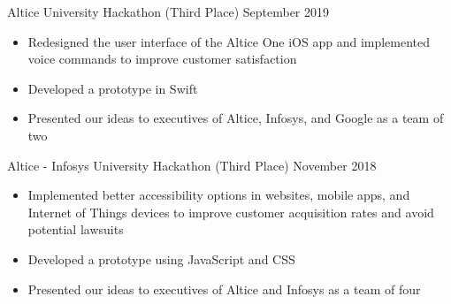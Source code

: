 \documentclass{article}
\begin{document}
\noindent
Altice University Hackathon (Third Place)
\hfill
September 2019\\
\vspace{-1em}
\begin{itemize}
\item Redesigned the user interface of the Altice One iOS app and implemented voice commands to improve customer satisfaction
\item Developed a prototype in Swift
\item Presented our ideas to executives of Altice, Infosys, and Google as a team of two
\end{itemize}

\noindent
Altice - Infosys University Hackathon (Third Place)
\hfill
November 2018\\
\vspace{-1em}
\begin{itemize}
\item Implemented better accessibility options in websites, mobile apps, and Internet of Things devices to improve customer acquisition rates and avoid potential lawsuits
\item Developed a prototype using JavaScript and CSS
\item Presented our ideas to executives of Altice and Infosys as a team of four
\end{itemize}


\noindent
\end{document}
